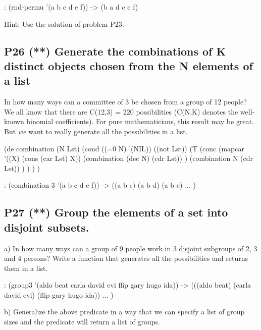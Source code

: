 \begin{wideverbatim}
   : (rnd-permu '(a b c d e f))
   -> (b a d c e f)
\end{wideverbatim}

Hint: Use the solution of problem P23.


\subsection*{{P26} (**) Generate the combinations of K
distinct objects chosen from the N elements of a list}
\label{sec:99-problems-P26}

In how many ways can a committee of 3 be chosen from a group of 12
people? We all know that there are C(12,3) = 220 possibilities (C(N,K)
denotes the well-known binomial coefficients). For pure mathematicians,
this result may be great. But \emph{we} want to really generate all the
possibilities in a list.

\begin{wideverbatim}

(de combination (N Lst)
   (cond
      ((=0 N) '(NIL))
      ((not Lst))
      (T
         (conc
            (mapcar
               '((X) (cons (car Lst) X))
               (combination (dec N) (cdr Lst)) )
            (combination N (cdr Lst)) ) ) ) )

\end{wideverbatim}

\begin{wideverbatim}
   : (combination 3 '(a b c d e f))
   -> ((a b c) (a b d) (a b e) ... )
\end{wideverbatim}

\pagebreak{}
\subsection*{{P27} (**) Group the elements of a set into
disjoint subsets.}
\label{sec:99-problems-P27}

a) In how many ways can a group of 9 people work in 3 disjoint subgroups
of 2, 3 and 4 persons? Write a function that generates all the
possibilities and returns them in a list.

\begin{wideverbatim}
   : (group3 '(aldo beat carla david evi flip gary hugo ida))
   -> (((aldo beat) (carla david evi) (flip gary hugo ida))
   ... )
\end{wideverbatim}

b) Generalize the above predicate in a way that we can specify a list of
group sizes and the predicate will return a list of groups.

